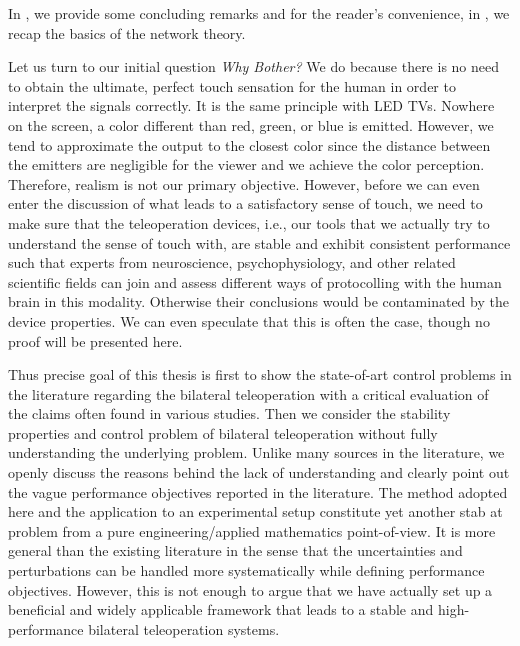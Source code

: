 In , we provide some concluding remarks and for the reader's convenience, in , we recap the basics 
of the network theory.

Let us turn to our initial question \emph{Why Bother?} We do because there is no need to obtain the ultimate, perfect touch sensation for 
the human in order to interpret the signals correctly. It is the same principle with LED TVs. Nowhere on the screen, a color different 
than red, green, or blue is emitted. However, we tend to approximate the output to the closest color since the distance between the 
emitters are negligible for the viewer and we achieve the color perception. Therefore, realism is not our primary objective. However, 
before we can even enter the discussion of what leads to a satisfactory sense of touch, we need to make sure that the teleoperation 
devices, i.e., our tools that we actually try to understand the sense of touch with, are stable and exhibit consistent performance such 
that experts from neuroscience, psychophysiology, and other related scientific fields can join and assess different ways of protocolling 
with the human brain in this modality. Otherwise their conclusions would be contaminated by the device properties. We can even speculate 
that this is often the case, though no proof will be presented here.  


Thus precise goal of this thesis is first to show the state-of-art control problems in the literature regarding the bilateral 
teleoperation with a critical evaluation of the claims often found in various studies. Then we consider the stability properties and 
control problem of bilateral teleoperation without fully understanding the underlying problem. Unlike many sources in the literature, we 
openly discuss the reasons behind the lack of understanding and clearly point out the vague performance objectives reported in the 
literature. The method adopted here and the application to an experimental setup constitute yet another stab at problem from a pure 
engineering/applied mathematics point-of-view. It is more general than the existing literature in the sense that the uncertainties and 
perturbations can be handled more systematically while defining performance objectives. However, this is not enough to argue that we have 
actually set up a beneficial and widely applicable framework that leads to a stable and high-performance bilateral teleoperation systems. 
